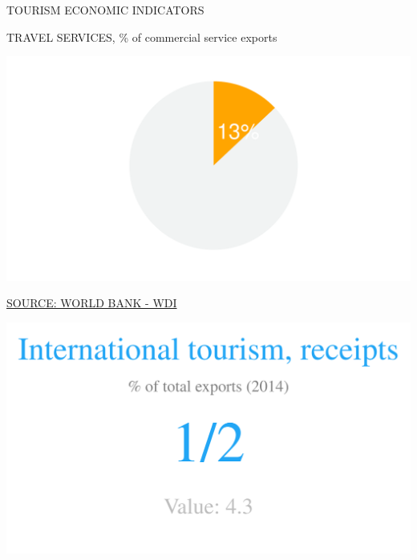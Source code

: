 \documentclass{article}\usepackage[]{graphicx}\usepackage[]{color}
\makeatletter
\def\maxwidth{ %
  \ifdim\Gin@nat@width>\linewidth
    \linewidth
  \else
    \Gin@nat@width
  \fi
}
\makeatother
\begin{document}
\begin{minipage}[c]{0.95\textwidth}
  \vspace{5ex}
  \begin{flushleft}  
    \hspace{4ex}\Large{\textcolor[HTML]{FF4023}{TOURISM ECONOMIC INDICATORS}}\hspace{2ex}\small{\textcolor[HTML]{818181} {}}
  \end{flushleft} 
  \begin{minipage}[c]{0.5\textwidth}
  \hspace{4ex}\small{\textcolor[HTML]{818181}{TRAVEL SERVICES, \% of commercial service exports}}
    \vspace{1ex}


{\centering \includegraphics[width=\maxwidth]{figure/pie2_1-1} 

}



  \hspace{4ex}\scriptsize{\href{NA}{\textcolor[HTML]{FF4023}{SOURCE: WORLD BANK - WDI}}}
  \end{minipage}
  \begin{minipage}[c]{0.5\textwidth}
  \hspace{4ex}\small{\textcolor[HTML]{818181}{}}
    \vspace{1ex}


{\centering \includegraphics[width=\maxwidth]{figure/numberBig2_1-1} 

}
\end{minipage}
\end{minipage}
\end{document}
